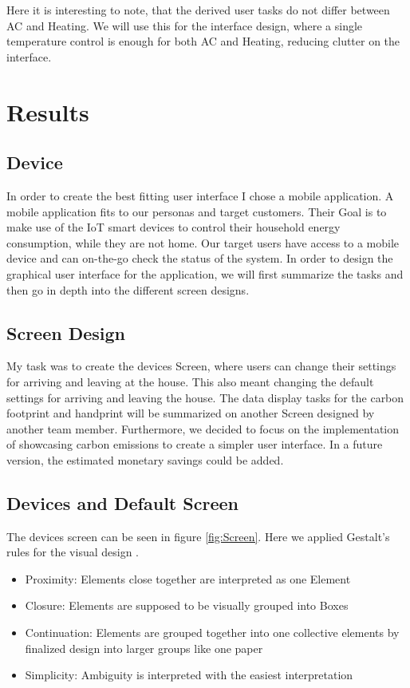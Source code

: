 \documentclass[]{interact}
\theoremstyle{plain}%
\theoremstyle{definition}
\theoremstyle{remark}
\begin{document}
Here it is interesting to note, that the derived user tasks do not differ between AC and Heating. We will use this for the interface design, where a single temperature control is enough for both AC and Heating, reducing clutter on the interface.

\section*{Results}

\subsection*{Device}

In order to create the best fitting user interface I chose a mobile application. A mobile application fits to our personas and target customers. Their Goal is to make use of the IoT smart devices to control their household energy consumption, while they are not home. Our target users have access to a mobile device and can on-the-go check the status of the system. In order to design the graphical user interface for the application, we will first summarize the tasks and then go in depth into the different screen designs.

\subsection*{Screen Design}

My task was to create the devices Screen, where users can change their settings for arriving and leaving at the house. This also meant changing the default settings for arriving and leaving the house. The data display tasks for the carbon footprint and handprint will be summarized on another Screen designed by another team member. Furthermore, we decided to focus on the implementation of showcasing carbon emissions to create a simpler user interface. In a future version, the estimated monetary savings could be added.

\subsection*{Devices and Default Screen}

The devices screen can be seen in figure \ref{fig:Screen}. Here we applied Gestalt's rules for the visual design \citep*{gkogka_gestalt_2018}.
\begin{itemize}
  \item Proximity: Elements close together are interpreted as one Element
  \item Closure: Elements are supposed to be visually grouped into Boxes
  \item Continuation: Elements are grouped together into one collective elements by finalized design into larger groups like one paper
  \item Simplicity: Ambiguity is interpreted with the easiest interpretation
\end{itemize}
\end{document}
